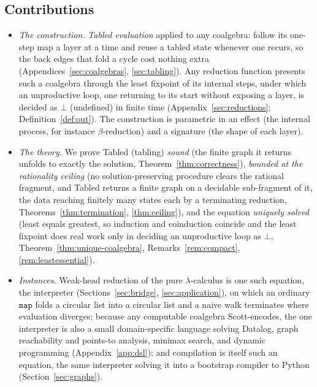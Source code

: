 \subsection{Contributions}
\begin{itemize}
  \item \emph{The construction.} \emph{Tabled evaluation} applied to any coalgebra: follow its
    one-step map a layer at a time and reuse a tabled state whenever one recurs, so the back
    edges that fold a cycle cost nothing extra (Appendices~\ref{sec:coalgebras},
    \ref{sec:tabling}). Any reduction function presents such a coalgebra through the least
    fixpoint of its internal steps, under which an unproductive loop, one returning to its
    start without exposing a layer, is decided as $\bot$ (undefined) in finite time
    (Appendix~\ref{sec:reductions}; Definition~\ref{def:out}). The construction is parametric in
    an effect (the internal process, for instance $\beta$-reduction) and a signature (the shape
    of each layer).
  \item \emph{The theory.} We prove \textsf{Tabled} (tabling) \emph{sound} (the finite graph it returns
    unfolds to exactly the solution, Theorem~\ref{thm:correctness}), \emph{bounded at the rationality ceiling} (no
      solution-preserving procedure clears the rational fragment, and \textsf{Tabled} returns a finite graph
      on a decidable sub-fragment of it, the data reaching finitely many states each by a terminating
      reduction, Theorems~\ref{thm:termination},
    \ref{thm:ceiling}), and the equation
    \emph{uniquely solved} (least equals greatest, so induction and coinduction coincide and
      the least fixpoint does real work only in deciding an unproductive loop as $\bot$,
    Theorem~\ref{thm:unique-coalgebra}, Remarks~\ref{rem:compact}, \ref{rem:leastessential}).
  \item \emph{Instances.} Weak-head reduction of the pure $\lambda$-calculus is one such equation,
    the interpreter (Sections~\ref{sec:bridge}, \ref{sec:application}), on which an ordinary
    $\mathtt{map}$ folds a circular list into a circular list and a naive walk terminates where
    evaluation diverges; because any computable coalgebra Scott-encodes, the one interpreter is also a small
    domain-specific language solving Datalog, graph reachability and points-to analysis, minimax
    search, and dynamic programming (Appendix~\ref{app:dsl}); and compilation is itself such an
    equation, the same interpreter solving it into a bootstrap compiler to Python
    (Section~\ref{sec:graphs}).
\end{itemize}

